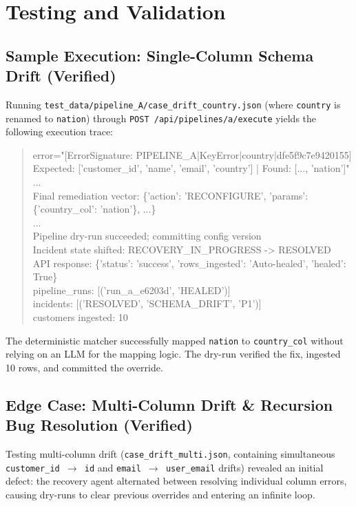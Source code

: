\documentclass[11pt]{article}
\newcommand{\code}[1]{\texttt{\small #1}}
\newenvironment{logblock}{%
  \par\noindent\footnotesize\ttfamily
  \begin{quote}\noindent
}{%
  \end{quote}\normalfont\normalsize
}
\begin{document}
\section{Testing and Validation}

\subsection{Sample Execution: Single-Column Schema Drift (Verified)}
Running \code{test\_data/pipeline\_A/case\_drift\_country.json} (where \code{country} is renamed to \code{nation}) through \code{POST /api/pipelines/a/execute} yields the following execution trace:

\begin{logblock}
error="[ErrorSignature: PIPELINE\_A|KeyError|country|dfe5f9c7e9420155] Expected: ['customer\_id', 'name', 'email', 'country'] | Found: [..., 'nation']"\\
...\\
Final remediation vector: \{'action': 'RECONFIGURE', 'params': \{'country\_col': 'nation'\}, ...\}\\
...\\
Pipeline dry-run succeeded; committing config version\\
Incident state shifted: RECOVERY\_IN\_PROGRESS -> RESOLVED\\[4pt]
API response: \{'status': 'success', 'rows\_ingested': 'Auto-healed', 'healed': True\}\\
pipeline\_runs: [('run\_a\_e6203d', 'HEALED')]\\
incidents:     [('RESOLVED', 'SCHEMA\_DRIFT', 'P1')]\\
customers ingested: 10
\end{logblock}

The deterministic matcher successfully mapped \code{nation} to \code{country\_col} without relying on an LLM for the mapping logic. The dry-run verified the fix, ingested 10 rows, and committed the override.

\subsection{Edge Case: Multi-Column Drift \& Recursion Bug Resolution (Verified)}
Testing multi-column drift (\code{case\_drift\_multi.json}, containing simultaneous \code{customer\_id $\rightarrow$ id} and \code{email $\rightarrow$ user\_email} drifts) revealed an initial defect: the recovery agent alternated between resolving individual column errors, causing dry-runs to clear previous overrides and entering an infinite loop.
\end{document}
